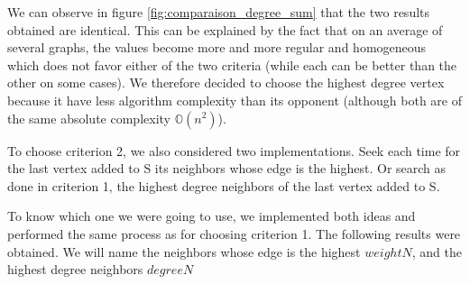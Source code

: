 We can observe in figure \ref{fig:comparaison_degree_sum} that the two results obtained are identical. This can be explained by the fact that on an average of several graphs, the values become more and more regular and homogeneous which does not favor either of the two criteria (while each can be better than the other on some cases). We therefore decided to choose the highest degree vertex because it have less algorithm complexity than its opponent (although both are of the same absolute complexity $\mathbb{O}(n^2)$).
\bigskip

To choose criterion 2, we also considered two implementations. Seek each time for the last vertex added to S its neighbors whose edge is the highest. Or search as done in criterion 1, the highest degree neighbors of the last vertex added to S.
\bigskip

To know which one we were going to use, we implemented both ideas and performed the same process as for choosing criterion 1. The following results were obtained. We will name the neighbors whose edge is the highest $weightN$, and the highest degree neighbors $degreeN$
\bigskip

